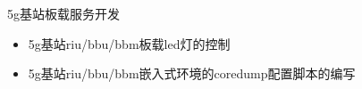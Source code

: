   \item 5g基站板载服务开发
  \begin{itemize}
    \item 5g基站riu/bbu/bbm板载led灯的控制
    \item 5g基站riu/bbu/bbm嵌入式环境的coredump配置脚本的编写
  \end{itemize}
